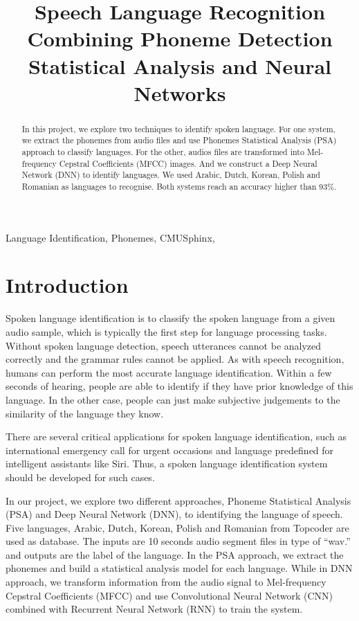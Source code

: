 \documentclass{article}
\title{Speech Language Recognition Combining Phoneme Detection Statistical Analysis and Neural Networks}
\begin{document}
%
\maketitle
%
\begin{abstract}
In this project, we explore two techniques to identify spoken language. For one system, we extract the phonemes from audio files and use Phonemes Statistical Analysis (PSA) approach to classify languages. For the other, audios files are transformed into Mel-frequency Cepstral Coefficients (MFCC) images. And we construct a Deep Neural Network (DNN) to identify languages. We used Arabic, Dutch, Korean, Polish and Romanian as languages to recognise. Both systems reach an accuracy higher than 93\%.
\end{abstract}
%
\begin{keywords}
Language Identification, Phonemes, CMUSphinx,
\end{keywords}
%
\section{Introduction}
\label{sec:intro}
Spoken language identification is to classify the spoken language from a given audio sample, which is typically the first step for language processing tasks. Without spoken language detection, speech utterances cannot be analyzed correctly and the grammar rules cannot be applied. As with speech recognition, humans can perform the most accurate language identification.\cite{shi2006importance} Within a few seconds of hearing, people are able to identify if they have prior knowledge of this language. In the other case, people can just make subjective judgements to the similarity of the language they know.

There are several critical applications for spoken language identification, such as international emergency call for urgent occasions and language predefined for intelligent assistants like Siri. 
Thus, a spoken language identification system should be developed for such cases.

In our project, we explore two different approaches, Phoneme Statistical Analysis (PSA) and Deep Neural Network (DNN), to identifying the language of speech. Five languages, Arabic, Dutch, Korean, Polish and Romanian from Topcoder are used as database. The inputs are 10  seconds audio segment files in type of “wav.” and outputs are the label of the language. In the PSA approach, we extract the phonemes and build a statistical analysis model for each language. While in DNN approach, we transform information from the audio signal to Mel-frequency Cepstral Coefficients (MFCC) and use Convolutional Neural Network (CNN) combined with Recurrent Neural Network (RNN) to train the system.
\end{document}
